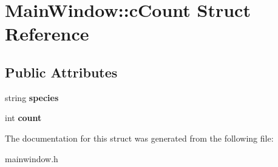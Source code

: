 \hypertarget{struct_main_window_1_1c_count}{}\section{Main\+Window\+:\+:c\+Count Struct Reference}
\label{struct_main_window_1_1c_count}
\subsection*{Public Attributes}
\begin{DoxyCompactItemize}
\item 
\mbox{\label{struct_main_window_1_1c_count_a3a27b9c45544b1b756ef21e9d185b003}} 
string {\bfseries species}
\item 
\mbox{\label{struct_main_window_1_1c_count_abc47f2450f6d9f23e4f74e35d72cc473}} 
int {\bfseries count}
\end{DoxyCompactItemize}


The documentation for this struct was generated from the following file\+:\begin{DoxyCompactItemize}
\item 
mainwindow.\+h\end{DoxyCompactItemize}
